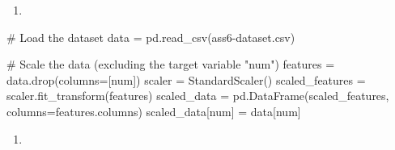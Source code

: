 \documentclass[
  11pt,
  letterpaper,
  DIV=11,
  numbers=noendperiod]{scrartcl}
\newenvironment{Shaded}{\begin{snugshade}}{\end{snugshade}}
\newcommand{\CommentTok}[1]{\textcolor[rgb]{0.37,0.37,0.37}{#1}}
\newcommand{\NormalTok}[1]{\textcolor[rgb]{0.00,0.23,0.31}{#1}}
\newcommand{\OperatorTok}[1]{\textcolor[rgb]{0.37,0.37,0.37}{#1}}
\newcommand{\StringTok}[1]{\textcolor[rgb]{0.13,0.47,0.30}{#1}}
\providecommand{\tightlist}{%
  \setlength{\itemsep}{0pt}\setlength{\parskip}{0pt}}\usepackage{longtable,booktabs,array}
\begin{document}
\begin{enumerate}
\def\labelenumi{(\arabic{enumi})}
\setcounter{enumi}{1}
\tightlist
\item
\end{enumerate}

\begin{Shaded}
\begin{Highlighting}[]
\CommentTok{\# Load the dataset}
\NormalTok{data }\OperatorTok{=}\NormalTok{ pd.read\_csv(}\StringTok{\textquotesingle{}ass6{-}dataset.csv\textquotesingle{}}\NormalTok{)}

\CommentTok{\# Scale the data (excluding the target variable "num")}
\NormalTok{features }\OperatorTok{=}\NormalTok{ data.drop(columns}\OperatorTok{=}\NormalTok{[}\StringTok{\textquotesingle{}num\textquotesingle{}}\NormalTok{])}
\NormalTok{scaler }\OperatorTok{=}\NormalTok{ StandardScaler()}
\NormalTok{scaled\_features }\OperatorTok{=}\NormalTok{ scaler.fit\_transform(features)}
\NormalTok{scaled\_data }\OperatorTok{=}\NormalTok{ pd.DataFrame(scaled\_features, columns}\OperatorTok{=}\NormalTok{features.columns)}
\NormalTok{scaled\_data[}\StringTok{\textquotesingle{}num\textquotesingle{}}\NormalTok{] }\OperatorTok{=}\NormalTok{ data[}\StringTok{\textquotesingle{}num\textquotesingle{}}\NormalTok{]}
\end{Highlighting}
\end{Shaded}

\begin{enumerate}
\def\labelenumi{(\arabic{enumi})}
\setcounter{enumi}{2}
\tightlist
\item
\end{enumerate}
\end{document}
